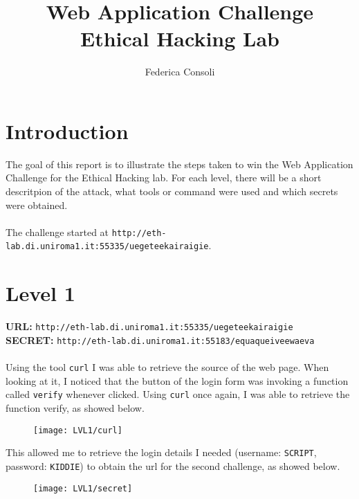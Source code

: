 \documentclass[12pt,a4paper]{article}
\author{Federica Consoli}
\title{Web Application Challenge \\ \large Ethical Hacking Lab}
\begin{document}
	\maketitle
	\section*{Introduction}
		The goal of this report is to illustrate the steps taken to win the Web Application Challenge for the Ethical Hacking lab. For each level, there will be a short descritpion of the attack, what tools or command were used and which secrets were obtained.\\\\The challenge started at
		 \texttt{http://eth-lab.di.uniroma1.it:55335/uegeteekairaigie}.
		 
	\section*{Level 1}
	\textbf{URL: }\texttt{http://eth-lab.di.uniroma1.it:55335/uegeteekairaigie }\\
	\textbf{SECRET: }\texttt{http://eth-lab.di.uniroma1.it:55183/equaqueiveewaeva}\\\\
	Using the tool \texttt{curl} I was able to retrieve the source of the web page. When looking at it, I noticed that the button of the login form was invoking a function called \texttt{verify} whenever clicked. Using \texttt{curl} once again, I was able to retrieve the function verify, as showed below.
	
	\begin{figure}[H]
		\centering
		\texttt{[image: LVL1/curl]}
		\label{fig:curl}
	\end{figure}
	
	This allowed me to retrieve the login details I needed (username: \texttt{SCRIPT}, password: \texttt{KIDDIE}) to obtain the url for the second challenge, as showed below.
	\begin{figure}[H]
		\centering
		\texttt{[image: LVL1/secret]}
		\label{fig:secret1}
	\end{figure}
	\newpage

\end{document}
